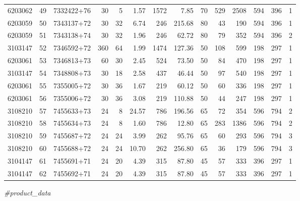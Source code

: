 \documentclass[
]{article}
\newenvironment{Shaded}{\begin{snugshade}}{\end{snugshade}}
\newcommand{\CommentTok}[1]{\textcolor[rgb]{0.56,0.35,0.01}{\textit{#1}}}
\newcommand{\DataTypeTok}[1]{\textcolor[rgb]{0.13,0.29,0.53}{#1}}
\newcommand{\DecValTok}[1]{\textcolor[rgb]{0.00,0.00,0.81}{#1}}
\newcommand{\KeywordTok}[1]{\textcolor[rgb]{0.13,0.29,0.53}{\textbf{#1}}}
\newcommand{\NormalTok}[1]{#1}
\newcommand{\OperatorTok}[1]{\textcolor[rgb]{0.81,0.36,0.00}{\textbf{#1}}}
\newcommand{\StringTok}[1]{\textcolor[rgb]{0.31,0.60,0.02}{#1}}
\begin{document}
\begin{longtable}[]{@{}rrlrrrrrrrrrrr@{}}
6203062 & 49 & 7332422+76 & 30 & 5 & 1.57 & 1572 & 7.85 & 70 & 529 &
2508 & 594 & 396 & 1\tabularnewline
6203059 & 50 & 7343137+72 & 30 & 32 & 6.74 & 246 & 215.68 & 80 & 43 &
190 & 594 & 396 & 1\tabularnewline
6203059 & 51 & 7343138+74 & 30 & 32 & 1.96 & 246 & 62.72 & 80 & 79 & 352
& 594 & 396 & 2\tabularnewline
3103147 & 52 & 7346592+72 & 360 & 64 & 1.99 & 1474 & 127.36 & 50 & 108 &
599 & 198 & 297 & 1\tabularnewline
6203061 & 53 & 7346813+73 & 60 & 30 & 2.45 & 524 & 73.50 & 50 & 84 & 470
& 198 & 297 & 1\tabularnewline
3103147 & 54 & 7348808+73 & 30 & 18 & 2.58 & 437 & 46.44 & 50 & 97 & 540
& 198 & 297 & 1\tabularnewline
6203061 & 55 & 7355005+72 & 30 & 36 & 1.67 & 219 & 60.12 & 50 & 60 & 336
& 198 & 297 & 1\tabularnewline
6203061 & 56 & 7355006+72 & 30 & 36 & 3.08 & 219 & 110.88 & 50 & 44 &
247 & 198 & 297 & 1\tabularnewline
3108210 & 57 & 7455633+73 & 24 & 8 & 24.57 & 786 & 196.56 & 65 & 72 &
354 & 596 & 794 & 2\tabularnewline
3108210 & 58 & 7455634+73 & 24 & 8 & 1.60 & 786 & 12.80 & 65 & 283 &
1386 & 596 & 794 & 2\tabularnewline
3108210 & 59 & 7455687+72 & 24 & 24 & 3.99 & 262 & 95.76 & 65 & 60 & 293
& 596 & 794 & 3\tabularnewline
3108210 & 60 & 7455688+72 & 24 & 24 & 10.70 & 262 & 256.80 & 65 & 36 &
179 & 596 & 794 & 3\tabularnewline
3104147 & 61 & 7455691+71 & 24 & 20 & 4.39 & 315 & 87.80 & 45 & 57 & 333
& 396 & 297 & 1\tabularnewline
3104147 & 62 & 7455692+71 & 24 & 20 & 4.39 & 315 & 87.80 & 45 & 57 & 333
& 396 & 297 & 1\tabularnewline
\bottomrule
\end{longtable}

\begin{Shaded}
\begin{Highlighting}[]
\CommentTok{#product_data}
\end{Highlighting}
\end{Shaded}

\begin{Shaded}
\end{Shaded}
\end{document}
